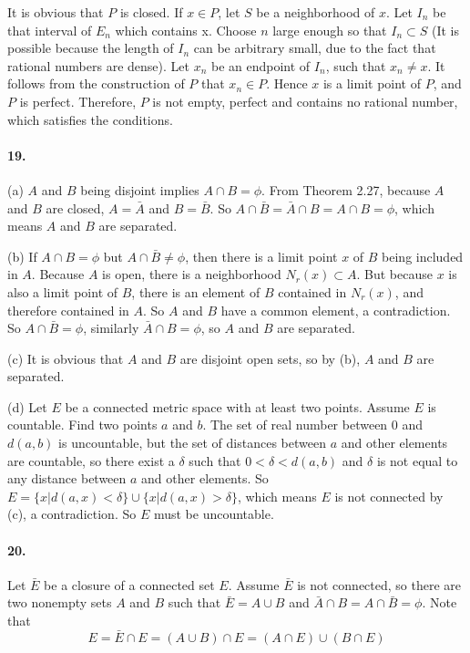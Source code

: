 \documentclass[a4paper]{article}
\begin{document}
It is obvious that $P$ is closed. If $x\in P$, let $S$ be a neighborhood of $x$. Let $I_n$ be that interval of $E_n$ which contains x. Choose $n$ large enough so that $I_n\subset S$ (It is possible because the length of $I_n$ can be arbitrary small, due to the fact that rational numbers are dense). Let $x_n$ be an endpoint of $I_n$, such that $x_n\neq x$. It follows from the construction of $P$ that $x_n\in P$. Hence $x$ is a limit point of $P$, and $P$ is perfect. Therefore, $P$ is not empty, perfect and contains no rational number, which satisfies the conditions.

\paragraph{19.}
(a) $A$ and $B$ being disjoint implies $A\cap B=\phi$. From Theorem 2.27, because $A$ and $B$ are closed, $A=\bar{A}$ and $B=\bar{B}$. So $A\cap\bar{B}=\bar{A}\cap B=A\cap B=\phi$,         which means $A$ and $B$ are separated.
\medskip

(b) If $A\cap B=\phi$ but $A\cap\bar{B}\neq\phi$, then there is a limit point $x$ of $B$ being included in $A$. Because $A$ is open, there is a neighborhood $N_r(x)\subset A$. But because $x$ is also a limit point of $B$, there is an element of $B$ contained in $N_r(x)$, and therefore contained in $A$. So $A$ and $B$ have a common element, a contradiction. So $A\cap\bar{B}=\phi$, similarly $\bar{A}\cap B=\phi$, so $A$ and $B$ are separated.
\medskip

(c) It is obvious that $A$ and $B$ are disjoint open sets, so by (b), $A$ and $B$ are separated.
\medskip

(d) Let $E$ be a connected metric space with at least two points. Assume $E$ is countable. Find two points $a$ and $b$. The set of real number between $0$ and $d(a,b)$ is uncountable, but the set of distances between $a$ and other elements are countable, so there exist a $\delta$ such that $0<\delta<d(a,b)$ and $\delta$ is not equal to any distance between $a$ and other elements. So $E=\{x|d(a,x)<\delta\}\cup\{x|d(a,x)>\delta\}$, which means $E$ is not connected by (c), a contradiction. So $E$ must be uncountable.

\paragraph{20.}
Let $\bar{E}$ be a closure of a connected set $E$. Assume $\bar{E}$ is not connected, so there are two nonempty sets $A$ and $B$ such that $\bar{E}=A\cup B$ and $\bar{A}\cap B=A\cap\bar{B}=\phi$. Note that
\[E=\bar{E}\cap E=(A\cup B)\cap E=(A\cap E)\cup(B\cap E)\] 
\end{document}
